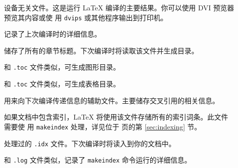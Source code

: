 \begin{description}
\item[] 设备无关文件。这是运行 \LaTeX{} 编译的主要结果。你可以使用 DVI 预览器预览其内容或使
  用 \texttt{dvips} 或其他程序输出到打印机。
\item[] 记录了上次编译时的详细信息。
\item[]
  储存了所有的章节标题。下次编译时将读取该文件并生成目录。
\item[] 和 \texttt{.toc} 文件类似，可生成图形目录。
\item[] 和 \texttt{.toc} 文件类似，可生成表格目录。
\item[] 用来向下次编译传递信息的辅助文件。主要储存交叉引用的相关信息。
\item[] 如果文档中包含索引，\LaTeX{} 将使用该文件存储所有的索引词条。此文件需要使
  用 \texttt{makeindex} 处理，详见位于 \pageref{sec:indexing} 页的第 \ref{sec:indexing} 节。
\item[] 处理过的 \texttt{.idx} 文件。下次编译时将读入到你的文档中。
\item[]
  和 \texttt{.log} 文件类似，记录了 \texttt{makeindex} 命令运行的详细信息。
\end{description}

